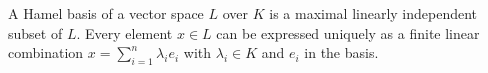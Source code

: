 A Hamel basis of a vector space $L$ over $K$ is a maximal linearly independent subset of $L$. Every element $x \in L$ can be expressed uniquely as a finite linear combination $x = \sum_{i=1}^n \lambda_i e_i$ with $\lambda_i \in K$ and $e_i$ in the basis.
